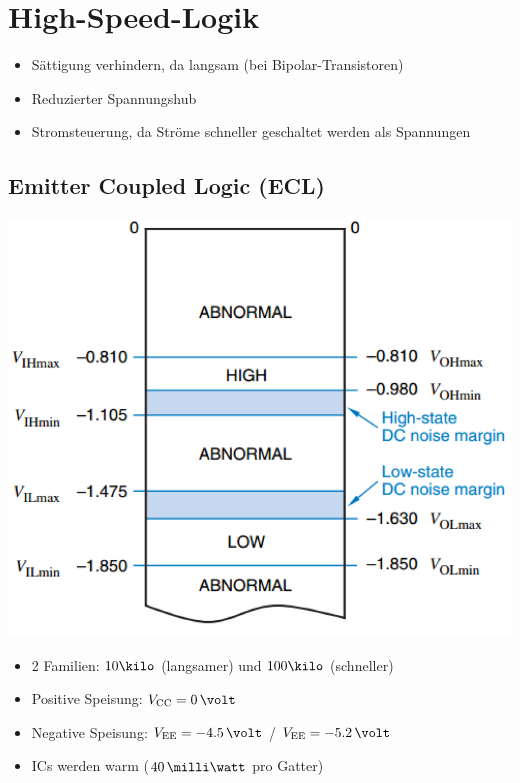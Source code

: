 \section{High-Speed-Logik}

\begin{itemize}
    \item Sättigung verhindern, da langsam (bei Bipolar-Transistoren)
    \item Reduzierter Spannungshub
    \item Stromsteuerung, da Ströme schneller geschaltet werden als Spannungen
\end{itemize}


\subsection{Emitter Coupled Logic (ECL)}

\begin{minipage}[c]{0.3\columnwidth}
    \includegraphics[width=\columnwidth]{images/ECL_logikpegel.png}
\end{minipage}
\hfill
\begin{minipage}[c]{0.68\columnwidth}
    \begin{itemize}
        \item 2 Familien: $10 \kilo$ (langsamer) und $100 \kilo$ (schneller)
        \item Positive Speisung: $V_{\rm CC} = 0 \, \volt$
        \item Negative Speisung: $V_{\rm EE} = -4.5 \, \volt$ / $V_{\rm EE} = -5.2 \, \volt$ 
        \item ICs werden warm ($40 \, \milli \watt$ pro Gatter)
    \end{itemize}
\end{minipage}

